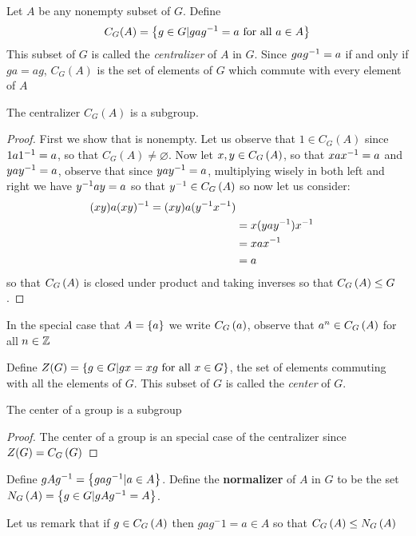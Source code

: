 \begin{defn}
	Let $ A $ be any nonempty subset of $ G $. Define \[  C_G(A)  = \left\lbrace g \in G | gag^{-1} = a \textrm{ for all } a \in A \right\rbrace  \]This subset of $ G $ is called the \emph{centralizer} of $ A $ in $ G $. Since $ gag^{-1} = a $ if and only if $ ga = ag $, $ C_G(A) $ is the set of elements of $ G $ which commute with every element of $ A $
\end{defn}

\begin{prop}
	The centralizer $ C_G(A) $ is a subgroup.
\end{prop}
\begin{proof}
	First we show that is nonempty. Let us observe that $ 1 \in C_G(A) $ since $ 1a1^{-1} = a $, so that $ C_G(A) \neq \varnothing $. Now let $ x, y \in C_{G}\left( A \right) $, so that $ xax^{-1} =a $ and $ yay^{-1} = a $, observe that since $ yay^{-1} = a $, multiplying wisely in both left and right we have $ y^{-1} a y = a $  so that $ y^{-1} \in C_{G}\left( A \right) $ so now let us consider:
	\begin{align*}
	(xy)a(xy)^{-1} = (xy)a(y^{-1} x^{-1}) \\
	&= x(yay^{-1})x^{-1} \\
	&= x a x^{-1} \\
	&= a
	\end{align*}
	so that $ C_{G}\left( A \right) $ is closed under product and taking inverses so that $ C_{G}\left( A \right) \leq G $. 
\end{proof}
In the special case that $ A = \left\lbrace a \right\rbrace $ we write $ C_{G}\left( a \right) $, observe that $ a^n \in C_{G}\left( A \right) $ for all $ n \in \mathbb{Z} $

\begin{defn}
	Define $ Z(G) = \left\lbrace g \in G| gx = xg \textrm{ for all } x \in G \right\rbrace $, the set of elements commuting with all the elements of $ G $. This subset of $ G $ is called the \textit{center} of $ G $.
\end{defn}
\begin{rem}
	The center of a group is a subgroup
\end{rem}
\begin{proof}
	The center of a group is an special case of the centralizer since $ Z(G) = C_{G}\left( G \right) $
\end{proof}
\begin{defn}
	Define $ gAg^{-1} = \left\lbrace gag^{-1} | a \in A \right\rbrace $. Define the \textbf{normalizer} of $ A $ in $ G $ to be the set $ N_{G}\left( A \right) = \left\lbrace g \in G | gAg^{-1} = A \right\rbrace $.
\end{defn}
Let us remark that if $ g \in C_{G}\left( A \right) $ then $ gag^-1 =a \in  A $ so that $ C_{G}\left( A \right) \leq N_{G}\left( A \right) $

